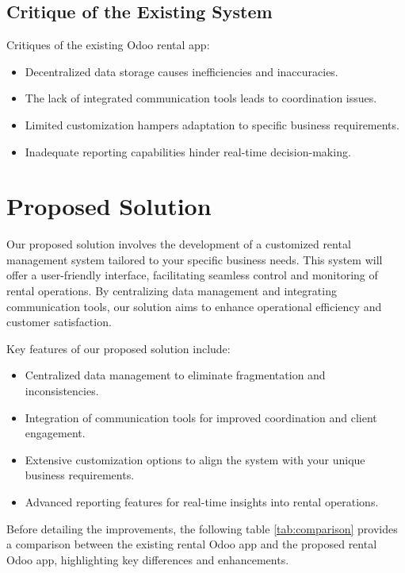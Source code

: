 \subsection{Critique of the Existing System}

Critiques of the existing Odoo rental app:
\begin{itemize}
    \item Decentralized data storage causes inefficiencies and inaccuracies.
    \item The lack of integrated communication tools leads to coordination issues.
    \item Limited customization hampers adaptation to specific business requirements.
    \item Inadequate reporting capabilities hinder real-time decision-making.
\end{itemize}

\section{Proposed Solution}

Our proposed solution involves the development of a customized rental management system tailored to your specific business needs. This system will offer a user-friendly interface, facilitating seamless control and monitoring of rental operations. By centralizing data management and integrating communication tools, our solution aims to enhance operational efficiency and customer satisfaction.

Key features of our proposed solution include:

\begin{itemize}
    \item Centralized data management to eliminate fragmentation and 
\\ inconsistencies.
    \item Integration of communication tools for improved coordination and client engagement.
    \item Extensive customization options to align the system with your unique business requirements.
    \item Advanced reporting features for real-time insights into rental operations.
\end{itemize}


Before detailing the improvements, the following table \ref{tab:comparison}  provides a comparison between the existing rental Odoo app and the proposed rental Odoo app, highlighting key differences and enhancements.

